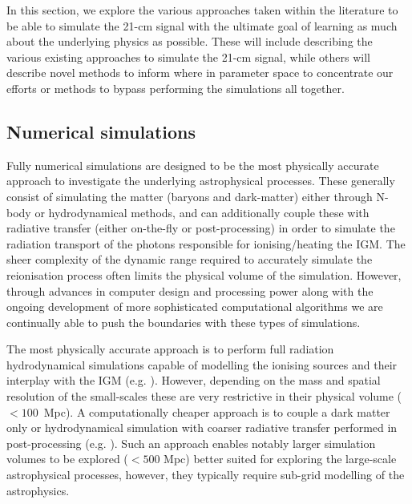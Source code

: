 In this section, we explore the various approaches taken within the literature to be able to simulate the 21-cm signal with the ultimate goal of learning as much about the underlying physics as possible. These will include describing the various existing approaches to simulate the 21-cm signal, while others will describe novel methods to inform where in parameter space to concentrate our efforts or methods to bypass performing the simulations all together.

\subsection{Numerical simulations}

Fully numerical simulations are designed to be the most physically accurate approach to investigate the underlying astrophysical processes. These generally consist of simulating the matter (baryons and dark-matter) either through N-body or hydrodynamical methods, and can additionally couple these with radiative transfer (either on-the-fly or post-processing) in order to simulate the radiation transport of the photons responsible for ionising/heating the IGM. The sheer complexity of the dynamic range required to accurately simulate the reionisation process often limits the physical volume of the simulation. However, through advances in computer design and processing power along with the ongoing development of more sophisticated computational algorithms we are continually able to push the boundaries with these types of simulations.

The most physically accurate approach is to perform full radiation hydrodynamical simulations capable of modelling the ionising sources and their interplay with the IGM (e.g. \cite{Ciardi:2001,Gnedin:2006,Finlator:2011,Gnedin:2014,Wise:2014,So:2014,OShea:2015,Norman:2015,Ocvirk:2016,Pawlik:2017,Ocvirk:2018,Rosdahl:2018,Wu:2019}). However, depending on the mass and spatial resolution of the small-scales these are very restrictive in their physical volume ($<100$~Mpc). A computationally cheaper approach is to couple a dark matter only or hydrodynamical simulation with coarser radiative transfer performed in post-processing (e.g. \cite{Iliev:2006,McQuinn:2007,Trac:2007,Ciardi:2012,Iliev:2014,Dixon:2016}). Such an approach enables notably larger simulation volumes to be explored ($<500$ Mpc) better suited for exploring the large-scale astrophysical processes, however, they typically require sub-grid modelling of the astrophysics.

